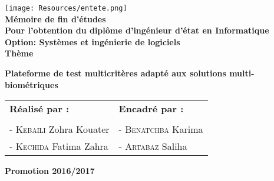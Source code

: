 
\begin{titlepage}
 \begin{center}
 \texttt{[image: Resources/entete.png]}\\
 \vspace*{1cm}
  \LARGE
  \textbf{Mémoire de fin d’études\\}
  \large
 \textbf{ Pour l’obtention du diplôme d’ingénieur d’état en Informatique}\\
  \LARGE
  	\vspace{2cm}
  \textbf{Option: Systèmes et ingénierie de logiciels}\\
  \vspace{1cm}
  \LARGE
  \textbf{Thème}\\
  \vspace{1cm}
  \LARGE
  \setlength{\fboxsep}{0.5cm}
  \begin{framed}
	\textbf{Plateforme de test multicritères adapté aux solutions multi-biométriques}
  \end{framed}
  \vspace{2cm}
  \begin{table}[H]
   \setlength{\tabcolsep}{2cm}
    \large
	\centering
	\begin{tabular}{ll}
		\textbf{Réalisé par :}    
		 & \textbf{Encadré par : } \\  \\
		 -\textsc{ Kebaili} Zohra Kouater 
	
	& -\textsc{ Benatchba} Karima  \\
		-\textsc{ Kechida} Fatima Zahra 
    &-\textsc{ Artabaz} Saliha  

	\end{tabular}
  \end{table}
  \vspace{\fill}
  \large
  \textbf{Promotion 2016/2017}
        
 \end{center}
\end{titlepage}